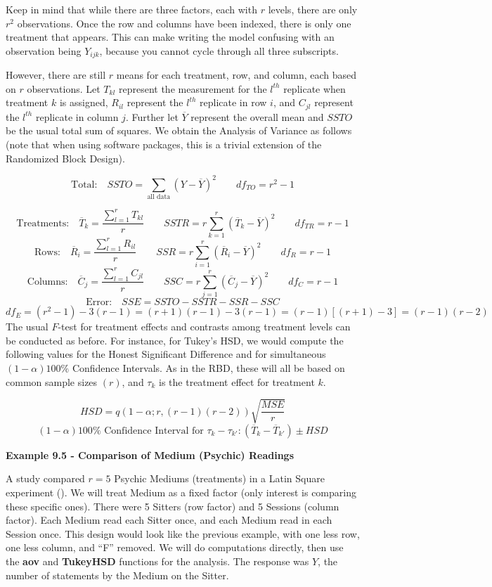 \documentclass[
]{book}
\begin{document}
Keep in mind that while there are three factors, each with \(r\) levels,
there are only \(r^2\) observations. Once the row and columns have been
indexed, there is only one treatment that appears. This can make writing
the model confusing with an observation being \(Y_{ijk}\), because you
cannot cycle through all three subscripts.

However, there are still \(r\) means for each treatment, row, and
column, each based on \(r\) observations. Let \(T_{kl}\) represent the
measurement for the \(l^{th}\) replicate when treatment \(k\) is
assigned, \(R_{il}\) represent the \(l^{th}\) replicate in row \(i\),
and \(C_{jl}\) represent the \(l^{th}\) replicate in column \(j\).
Further let \(\overline{Y}\) represent the overall mean and \(SSTO\) be
the usual total sum of squares. We obtain the Analysis of Variance as
follows (note that when using software packages, this is a trivial
extension of the Randomized Block Design).

\[
\mbox{Total:} \quad SSTO = \sum_{\mbox{all data}}\left(Y-\overline{Y}\right)^2 \qquad
df_{TO}=r^2-1
\]

\[
\mbox{Treatments:} \quad \overline{T}_k=\frac{\sum_{l=1}^rT_{kl}}{r} \qquad
SSTR=r\sum_{k=1}^r\left(\overline{T}_k-\overline{Y}\right)^2 \qquad df_{TR}=r-1
\] \[
\mbox{Rows:} \quad \overline{R}_i=\frac{\sum_{l=1}^rR_{il}}{r} \qquad
SSR=r\sum_{i=1}^r\left(\overline{R}_i-\overline{Y}\right)^2 \qquad df_{R}=r-1
\] \[
\mbox{Columns:} \quad \overline{C}_j=\frac{\sum_{l=1}^rC_{jl}}{r} \qquad
SSC=r\sum_{j=1}^r\left(\overline{C}_j-\overline{Y}\right)^2 \qquad df_{C}=r-1
\] \[
\mbox{Error:} \quad SSE = SSTO-SSTR-SSR-SSC 
\] \[
df_E =\left(r^2-1\right)-3(r-1)=(r+1)(r-1)-3(r-1)=
(r-1)[(r+1)-3]=(r-1)(r-2)
\] The usual \(F\)-test for treatment effects and contrasts among
treatment levels can be conducted as before. For instance, for Tukey's
HSD, we would compute the following values for the Honest Significant
Difference and for simultaneous \((1-\alpha)100\%\) Confidence
Intervals. As in the RBD, these will all be based on common sample sizes
\((r)\), and \(\tau_k\) is the treatment effect for treatment \(k\).

\[
HSD = q(1-\alpha;r,(r-1)(r-2))\sqrt{\frac{MSE}{r}}
\] \[
(1-\alpha)100\% \mbox { Confidence Interval for } \tau_k-\tau_{k'}:
\left(\overline{T}_k-\overline{T}_{k'}\right) \pm HSD
\]

\textbf{Example 9.5 - Comparison of Medium (Psychic) Readings}

A study compared \(r=5\) Psychic Mediums (treatments) in a Latin Square
experiment (). We
will treat Medium as a fixed factor (only interest is comparing these
specific ones). There were 5 Sitters (row factor) and 5 Sessions (column
factor). Each Medium read each Sitter once, and each Medium read in each
Session once. This design would look like the previous example, with one
less row, one less column, and ``F'' removed. We will do computations
directly, then use the \textbf{aov} and \textbf{TukeyHSD} functions for
the analysis. The response was \(Y\), the number of statements by the
Medium on the Sitter.
\end{document}
